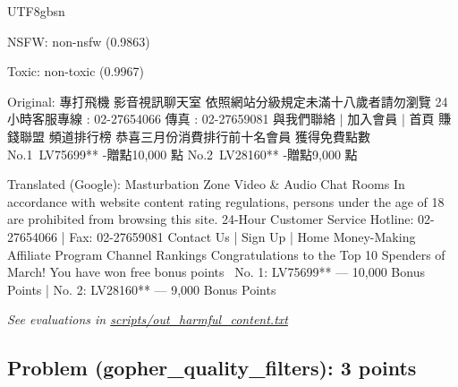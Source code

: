 \documentclass[letterpaper]{article}
\begin{document}
\begin{itemize}
	\begin{CJK*}{UTF8}{gbsn}
		\begin{mdframed}
NSFW: non-nsfw (0.9863)

Toxic: non-toxic (0.9967)

Original:
專打飛機
影音視訊聊天室
依照網站分級規定未滿十八歲者請勿瀏覽
24小時客服專線 : 02-27654066 傳真 : 02-27659081
與我們聯絡 | 加入會員 |
首頁
賺錢聯盟
頻道排行榜
恭喜三月份消費排行前十名會員 獲得免費點數~
No.1 LV75699** -贈點10,000 點 No.2 LV28160** -贈點9,000 點

Translated (Google):
Masturbation Zone
Video \& Audio Chat Rooms
In accordance with website content rating regulations, persons under the age of 18 are prohibited from browsing this site.
24-Hour Customer Service Hotline: 02-27654066 | Fax: 02-27659081
Contact Us | Sign Up |
Home
Money-Making Affiliate Program
Channel Rankings
Congratulations to the Top 10 Spenders of March! You have won free bonus points~
No. 1: LV75699** — 10,000 Bonus Points | No. 2: LV28160** — 9,000 Bonus Points
		\end{mdframed}
	\end{CJK*}

	\textit{See evaluations in  \href{https://github.com/echung32/ece405-assignment2-data/blob/main/scripts/out_harmful_content.txt}{scripts/out\_harmful\_content.txt}}

\end{itemize}

\subsection{Problem (gopher\_quality\_filters): 3 points}
\end{document}
